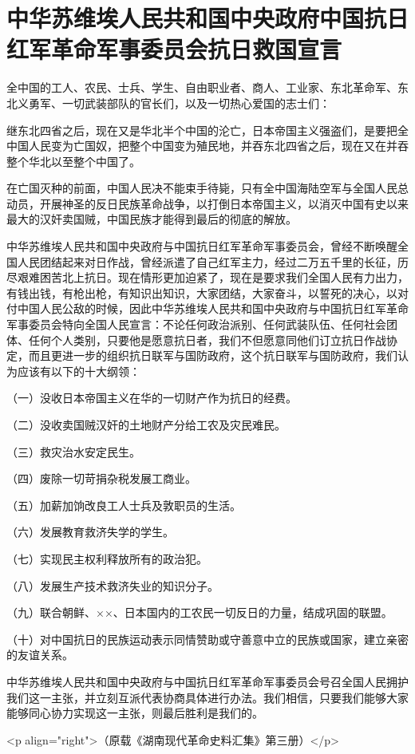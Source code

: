 \section[中华苏维埃人民共和国中央政府中国抗日红军革命军事委员会抗日救国宣言（一九三五年十一月二十八日）]{中华苏维埃人民共和国中央政府中国抗日红军革命军事委员会抗日救国宣言}


全中国的工人、农民、士兵、学生、自由职业者、商人、工业家、东北革命军、东北义勇军、一切武装部队的官长们，以及一切热心爱国的志士们：

继东北四省之后，现在又是华北半个中国的沦亡，日本帝国主义强盗们，是要把全中国人民变为亡国奴，把整个中国变为殖民地，并吞东北四省之后，现在又在并吞整个华北以至整个中国了。

在亡国灭种的前面，中国人民决不能束手待毙，只有全中国海陆空军与全国人民总动员，开展神圣的反日民族革命战争，以打倒日本帝国主义，以消灭中国有史以来最大的汉奸卖国贼，中国民族才能得到最后的彻底的解放。

中华苏维埃人民共和国中央政府与中国抗日红军革命军事委员会，曾经不断唤醒全国人民团结起来对日作战，曾经派遣了自己红军主力，经过二万五千里的长征，历尽艰难困苦北上抗日。现在情形更加迫紧了，现在是要求我们全国人民有力出力，有钱出钱，有枪出枪，有知识出知识，大家团结，大家奋斗，以誓死的决心，以对付中国人民公敌的时候，因此中华苏维埃人民共和国中央政府与中国抗日红军革命军事委员会特向全国人民宣言：不论任何政治派别、任何武装队伍、任何社会团体、任何个人类别，只要他是愿意抗日者，我们不但愿意同他们订立抗日作战协定，而且更进一步的组织抗日联军与国防政府，这个抗日联军与国防政府，我们认为应该有以下的十大纲领：

（一）没收日本帝国主义在华的一切财产作为抗日的经费。

（二）没收卖国贼汉奸的土地财产分给工农及灾民难民。

（三）救灾治水安定民生。

（四）废除一切苛捐杂税发展工商业。

（五）加薪加饷改良工人士兵及敦职员的生活。

（六）发展教育救济失学的学生。

（七）实现民主权利释放所有的政治犯。

（八）发展生产技术救济失业的知识分子。

（九）联合朝鲜、××、日本国内的工农民一切反日的力量，结成巩固的联盟。

（十）对中国抗日的民族运动表示同情赞助或守善意中立的民族或国家，建立亲密的友谊关系。

中华苏维埃人民共和国中央政府与中国抗日红军革命军事委员会号召全国人民拥护我们这一主张，并立刻互派代表协商具体进行办法。我们相信，只要我们能够大家能够同心协力实现这一主张，则最后胜利是我们的。

<p align="right">（原载《湖南现代革命史料汇集》第三册）</p>

